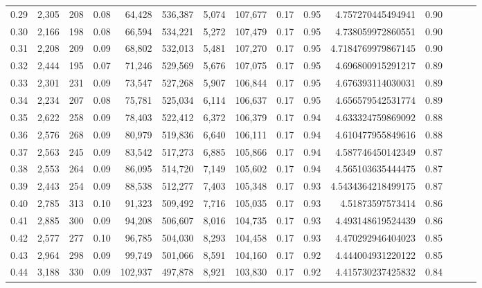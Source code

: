 \begin{tabular}{rrrrrrrrrrrrrrr}
0.29 &   2,305 &    208 &  0.08 &   64,428 &  536,387 &    5,074 &  107,677 &  0.17 &  0.95 &    4.757270445494941 &      0.90 \\
0.30 &   2,166 &    198 &  0.08 &   66,594 &  534,221 &    5,272 &  107,479 &  0.17 &  0.95 &    4.738059972860551 &      0.90 \\
0.31 &   2,208 &    209 &  0.09 &   68,802 &  532,013 &    5,481 &  107,270 &  0.17 &  0.95 &   4.7184769979867145 &      0.90 \\
0.32 &   2,444 &    195 &  0.07 &   71,246 &  529,569 &    5,676 &  107,075 &  0.17 &  0.95 &    4.696800915291217 &      0.89 \\
0.33 &   2,301 &    231 &  0.09 &   73,547 &  527,268 &    5,907 &  106,844 &  0.17 &  0.95 &    4.676393114030031 &      0.89 \\
0.34 &   2,234 &    207 &  0.08 &   75,781 &  525,034 &    6,114 &  106,637 &  0.17 &  0.95 &    4.656579542531774 &      0.89 \\
0.35 &   2,622 &    258 &  0.09 &   78,403 &  522,412 &    6,372 &  106,379 &  0.17 &  0.94 &    4.633324759869092 &      0.88 \\
0.36 &   2,576 &    268 &  0.09 &   80,979 &  519,836 &    6,640 &  106,111 &  0.17 &  0.94 &    4.610477955849616 &      0.88 \\
0.37 &   2,563 &    245 &  0.09 &   83,542 &  517,273 &    6,885 &  105,866 &  0.17 &  0.94 &    4.587746450142349 &      0.87 \\
0.38 &   2,553 &    264 &  0.09 &   86,095 &  514,720 &    7,149 &  105,602 &  0.17 &  0.94 &    4.565103635444475 &      0.87 \\
0.39 &   2,443 &    254 &  0.09 &   88,538 &  512,277 &    7,403 &  105,348 &  0.17 &  0.93 &   4.5434364218499175 &      0.87 \\
0.40 &   2,785 &    313 &  0.10 &   91,323 &  509,492 &    7,716 &  105,035 &  0.17 &  0.93 &     4.51873597573414 &      0.86 \\
0.41 &   2,885 &    300 &  0.09 &   94,208 &  506,607 &    8,016 &  104,735 &  0.17 &  0.93 &    4.493148619524439 &      0.86 \\
0.42 &   2,577 &    277 &  0.10 &   96,785 &  504,030 &    8,293 &  104,458 &  0.17 &  0.93 &    4.470292946404023 &      0.85 \\
0.43 &   2,964 &    298 &  0.09 &   99,749 &  501,066 &    8,591 &  104,160 &  0.17 &  0.92 &    4.444004931220122 &      0.85 \\
0.44 &   3,188 &    330 &  0.09 &  102,937 &  497,878 &    8,921 &  103,830 &  0.17 &  0.92 &    4.415730237425832 &      0.84 \\

\end{tabular}
